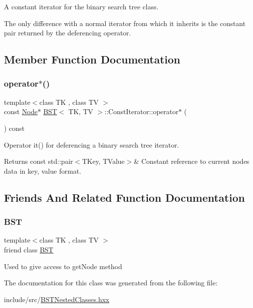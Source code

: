 A constant iterator for the binary search tree class. 

The only difference with a normal iterator from which it inherits is the constant pair returned by the deferencing operator. 

\subsection{Member Function Documentation}
\mbox{\label{classBST_1_1ConstIterator_ade0e6b8a4bbab47081c31a2a6d8c1b8c}} 
\subsubsection{\texorpdfstring{operator$\ast$()}{operator*()}}
{\footnotesize\ttfamily template$<$class TK , class TV $>$ \\
const \hyperlink{structBST_1_1Node}{Node}$\ast$ \hyperlink{classBST}{B\+ST}$<$ TK, TV $>$\+::Const\+Iterator\+::operator$\ast$ (\begin{DoxyParamCaption}{ }\end{DoxyParamCaption}) const\hspace{0.3cm}{\ttfamily [inline]}}



Operator it() for deferencing a binary search tree iterator. 

\begin{DoxyReturn}{Returns}
const std\+::pair$<$\+T\+Key, T\+Value$>$\& Constant reference to current node\textquotesingle{}s data in key, value format. 
\end{DoxyReturn}


\subsection{Friends And Related Function Documentation}
\mbox{\label{classBST_1_1ConstIterator_abf74961fd25e946e53e07f358b4bb19a}} 
\subsubsection{\texorpdfstring{B\+ST}{BST}}
{\footnotesize\ttfamily template$<$class TK , class TV $>$ \\
friend class \hyperlink{classBST}{B\+ST}\hspace{0.3cm}{\ttfamily [friend]}}

Used to give access to get\+Node method 

The documentation for this class was generated from the following file\+:\begin{DoxyCompactItemize}
\item 
include/src/\hyperlink{BSTNestedClasses_8hxx}{B\+S\+T\+Nested\+Classes.\+hxx}\end{DoxyCompactItemize}
